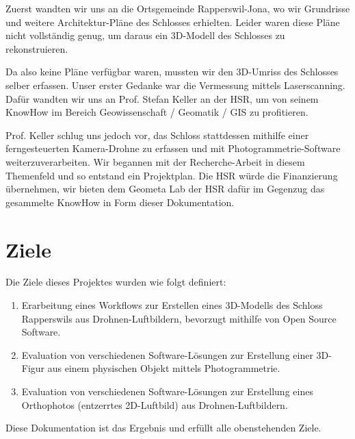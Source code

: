 Zuerst wandten wir uns an die Ortsgemeinde Rapperswil-Jona, wo wir Grundrisse
und weitere Architektur-Pläne des Schlosses erhielten. Leider waren diese Pläne
nicht vollständig genug, um daraus ein 3D-Modell des Schlosses zu rekonstruieren.

Da also keine Pläne verfügbar waren, mussten wir den 3D-Umriss des Schlosses
selber erfassen. Unser erster Gedanke war die Vermessung mittels Laserscanning.
Dafür wandten wir uns an Prof. Stefan Keller an der HSR, um von seinem KnowHow
im Bereich Geowissenschaft / Geomatik / GIS zu profitieren.

Prof. Keller schlug uns jedoch vor, das Schloss stattdessen mithilfe einer
ferngesteuerten Kamera-Drohne zu erfassen und mit Pho\-to\-gram\-met\-rie-Software
weiterzuverarbeiten. Wir begannen mit der Recherche-Arbeit in diesem Themenfeld
und so entstand ein Projektplan. Die HSR würde die Finanzierung übernehmen, wir
bieten dem Geometa Lab der HSR dafür im Gegenzug das gesammelte KnowHow in Form
dieser Dokumentation.


\section{Ziele}\label{sec:goals}

Die Ziele dieses Projektes wurden wie folgt definiert:

\begin{enumerate}
	\item Erarbeitung eines Workflows zur Erstellen eines 3D-Modells des Schloss
		Rapperswils aus Drohnen-Luftbildern, bevorzugt mithilfe von Open Source
		Software.
	\item Evaluation von verschiedenen Software-Lösungen zur Erstellung einer
		3D-Figur aus einem physischen Objekt mittels Photogrammetrie.
	\item Evaluation von verschiedenen Software-Lösungen zur Erstellung eines
		Orthophotos (entzerrtes 2D-Luftbild) aus Drohnen-Luft\-bil\-dern.
\end{enumerate}

\noindent Diese Dokumentation ist das Ergebnis und erfüllt alle obenstehenden Ziele.
